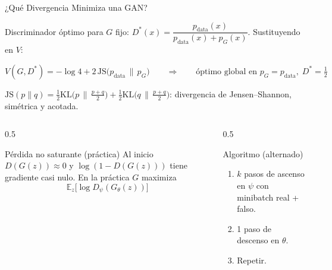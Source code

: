 \documentclass[aspectratio=169, 10pt]{beamer}
\providecommand{\E}{\mathbb{E}}
\newcommand{\KL}{\mathrm{KL}}
\newcommand{\pdata}{p_{\text{data}}}
\newcommand{\formula}[1]{%
	\begin{tcolorbox}[colback=UCMBlue!8, colframe=UCMBlue, arc=4pt,
		boxsep=2pt, left=6pt, right=6pt, top=3pt, bottom=3pt]
		#1
	\end{tcolorbox}
}
\begin{document}
\begin{frame}{¿Qu\'e Divergencia Minimiza una GAN?}

	Discriminador \'optimo para $G$ fijo: \quad $D^*(x) = \dfrac{\pdata(x)}{\pdata(x) + p_G(x)}$. \quad Sustituyendo en $V$:

	\formula{
		\[
		V(G, D^*) = -\log 4 + 2\,\mathrm{JS}\big(\pdata \,\|\, p_G\big)
		\qquad\Rightarrow\qquad \text{\'optimo global en } p_G = \pdata,\; D^* = \tfrac{1}{2}
		\]
	}

	\small $\mathrm{JS}(p\|q) = \frac{1}{2}\KL\big(p\,\|\,\tfrac{p+q}{2}\big) + \frac{1}{2}\KL\big(q\,\|\,\tfrac{p+q}{2}\big)$: divergencia de Jensen--Shannon, sim\'etrica y acotada.

	\vspace{0.3cm}

	\begin{columns}[T]
		\begin{column}{0.5\textwidth}
			\begin{block}{P\'erdida no saturante (pr\'actica)}
				\small
				Al inicio $D(G(z)) \approx 0$ y $\log(1-D(G(z)))$ tiene gradiente casi nulo. En la pr\'actica $G$ maximiza
				\[
				\E_z\big[\log D_\psi(G_\theta(z))\big]
				\]
			\end{block}
		\end{column}

		\begin{column}{0.5\textwidth}
			\begin{block}{Algoritmo (alternado)}
				\small
				\begin{enumerate}
					\item $k$ pasos de ascenso en $\psi$ con minibatch real + falso.
					\item 1 paso de descenso en $\theta$.
					\item Repetir.
				\end{enumerate}
			\end{block}
		\end{column}
	\end{columns}

\end{frame}
\end{document}
